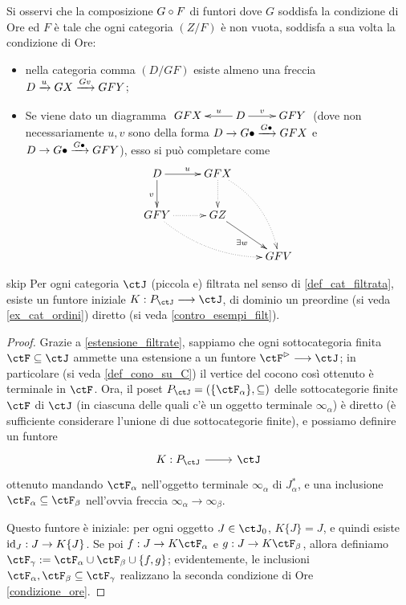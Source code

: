 Si osservi che la composizione \(G\circ F\) di funtori dove \(G\) soddisfa la condizione di Ore ed \(F\) è tale che ogni categoria \((Z/F)\) è non vuota, soddisfa a sua volta la condizione di Ore:
\begin{itemize}
	\item nella categoria comma \((D/GF)\) esiste almeno una freccia \(D \xrightarrow{u} GX \xrightarrow{Gv} GFY\);
	\item Se viene dato un diagramma \(\xymatrix{GFX & \ar[l]_-u D\ar[r]^-v & GFY}\) (dove non necessariamente \(u,v\) sono della forma \(D\to G\bullet\xrightarrow{G\bullet}GFX\) e \(D\to G\bullet\xrightarrow{G\bullet}GFY\)), esso si può completare come
	      \[\xymatrix{
		      D \ar[r]^u\ar[d]_v& GFX\ar@{.>}[d]\ar@{.>}@/^1pc/[ddr]\\
		      GFY \ar@{.>}[r]\ar@{.>}@/_1pc/[drr] & GZ\ar[dr]_{\exists w} \\
		      && GFV
		      }\]
\end{itemize}
\begin{hTheorem}{skip}
	Per ogni categoria \(\ctJ\) (piccola e) filtrata nel senso di \ref{def_cat_filtrata}, esiste un funtore iniziale \(K : P_\ctJ\fun\ctJ\), di dominio un preordine (si veda \ref{ex_cat_ordini}) diretto (si veda \ref{contro_esempi_filt}).
\end{hTheorem}
\begin{proof}
	Grazie a \ref{estensione_filtrate}, sappiamo che ogni sottocategoria finita \(\ctF\subseteq\ctJ\) ammette una estensione a un funtore \(\ctF^\rhd\fun\ctJ\); in particolare (si veda \ref{def_cono_su_C}) il vertice del cocono così ottenuto è terminale in \(\ctF\). Ora, il poset \(P_\ctJ = (\{\ctF_\alpha\},\subseteq)\) delle sottocategorie finite \(\ctF\) di \(\ctJ\) (in ciascuna delle quali c'è un oggetto terminale \(\infty_\alpha\)) è diretto (è sufficiente considerare l'unione di due sottocategorie finite), e possiamo definire un funtore
	\[\dmFun{K}{P_\ctJ}{\ctJ}\]
	ottenuto mandando \(\ctF_\alpha\) nell'oggetto terminale \(\infty_\alpha\) di \(J_\alpha^*\), e una inclusione \(\ctF_\alpha\subseteq\ctF_\beta\) nell'ovvia freccia \(\infty_\alpha\to\infty_\beta\).

	Questo funtore è iniziale: per ogni oggetto \(J\in\ctJ_0\), \(K\{J\}=J\), e quindi esiste \(\Id[J] : J\to K\{J\}\). Se poi \(f : J\to K\ctF_\alpha\) e \(g : J\to K\ctF_\beta\), allora definiamo \(\ctF_\gamma := \ctF_\alpha\cup\ctF_\beta\cup\{f,g\}\); evidentemente, le inclusioni \(\ctF_\alpha,\ctF_\beta\subseteq\ctF_\gamma\) realizzano la seconda condizione di Ore \ref{condizione_ore}.
\end{proof}
